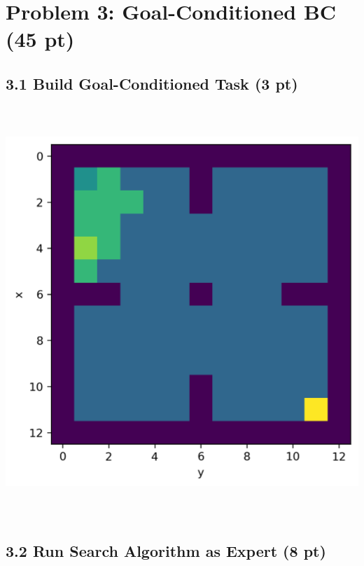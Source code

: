 \documentclass[12pt]{article}
\begin{document}
\clearpage
\section*{Problem 3: Goal-Conditioned BC (45 pt)}

\subsection*{3.1 Build Goal-Conditioned Task (3 pt)}
\includegraphics[height= 15.5cm, width=15.5cm]{p3-1-1}



\subsection*{3.2 Run Search Algorithm as Expert (8 pt)}

\begin{tcolorbox}[fit,height=30em, width=40em, blank, borderline={1pt}{1pt},nobeforeafter]
\begin{center}

\end{center}
\end{tcolorbox}
\end{document}
